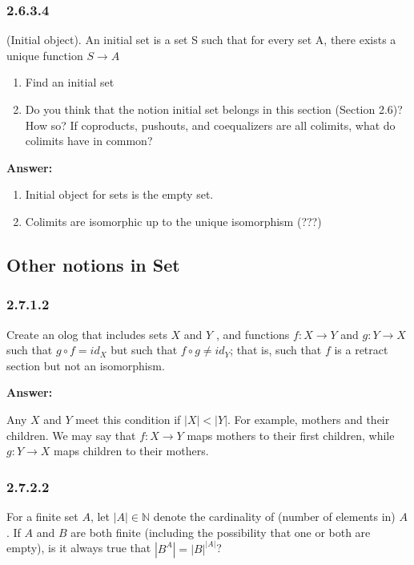 \documentclass{article}
\newcommand{\N}{\mathbb{N}}
\newcommand{\vsp}[0]{\vspace*{10pt}\par}
\newcommand{\exercise}[1]{\subsubsection*{#1}}
\newcommand{\ans}[0]{\vsp\textbf{Answer: }\vsp}
\newcommand{\ei}{\item}
\newcommand{\es}{\begin{enumerate}[label=(\alph*)]\ei}
\newcommand{\ee}{\end{enumerate}}
\begin{document}
\begin{center}
\end{center}


\exercise{2.6.3.4}

(Initial object). An initial set is a set S such that for every set A, there
exists a unique function $S \to A$

\es Find an initial set
\ei Do you think that the notion initial set belongs in this section (Section
    2.6)? How so? If coproducts, pushouts, and coequalizers are all colimits,
    what do colimits have in common?
\ee

\ans

\es Initial object for sets is the empty set.
\ei Colimits are isomorphic up to the unique isomorphism (???)
\ee

\subsection{Other notions in Set}

\exercise{2.7.1.2}

Create an olog that includes sets $X$ and $Y$ , and functions $f : X \to Y$ and
$g: Y \to X$ such that $g \circ f = id_X$ but such that $f \circ g \ne id_Y$;
that is, such that $f$ is a retract section but not an isomorphism.

\ans

Any $X$ and $Y$ meet this condition if $|X| < |Y|$. For example, mothers and
their children. We may say that $f:X \to Y$ maps mothers to their first
children, while $g:Y \to X$ maps children to their mothers.

\exercise{2.7.2.2}

For a finite set $A$, let $|A| \in \N$ denote the cardinality of (number of
elements in) $A$. If $A$ and $B$ are both finite (including the possibility that
one or both are empty), is it always true that $|B^A| = |B|^{|A|}$?
\end{document}
